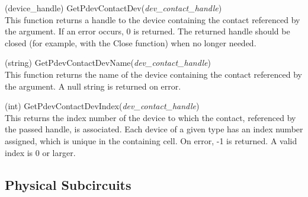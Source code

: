 \begin{description}
\item{(device\_handle) \vt GetPdevContactDev({\it dev\_contact\_handle\/})}\\
This function returns a handle to the device containing the contact
referenced by the argument.  If an error occurs, 0 is returned.  The
returned handle should be closed (for example, with the {\vt Close}
function) when no longer needed.

\item{(string) \vt GetPdevContactDevName({\it dev\_contact\_handle\/})}\\
This function returns the name of the device containing the contact
referenced by the argument.  A null string is returned on error.

\item{(int) \vt GetPdevContactDevIndex({\it dev\_contact\_handle\/})}\\
This returns the index number of the device to which the contact,
referenced by the passed handle, is associated.  Each device of a
given type has an index number assigned, which is unique in the
containing cell.  On error, -1 is returned.  A valid index is 0 or
larger.

\end{description}


\subsection{Physical Subcircuits}

